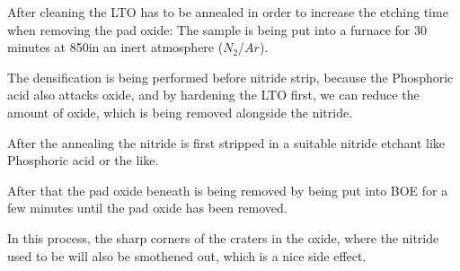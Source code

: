 After cleaning the LTO has to be annealed in order to increase the etching time when removing the pad oxide: The sample is being put into a furnace for 30 minutes at 850\degreesC in an inert atmosphere ($N_2$/$Ar$).

The densification is being performed before nitride strip, because the Phosphoric acid also attacks oxide, and by hardening the LTO first, we can reduce the amount of oxide, which is being removed alongside the nitride.

After the annealing the nitride is first stripped in a suitable nitride etchant like Phosphoric acid or the like.

After that the pad oxide beneath is being removed by being put into BOE for a few minutes until the pad oxide has been removed.

In this process, the sharp corners of the craters in the oxide, where the nitride used to be will also be smothened out, which is a nice side effect.

